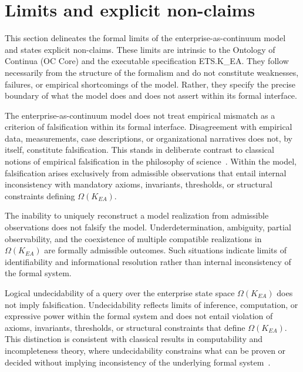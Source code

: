 ﻿\section{Limits and explicit non-claims}

This section delineates the formal limits of the
enterprise-as-continuum model and states explicit non-claims.
These limits are intrinsic to the Ontology of Continua (OC Core) and the
executable specification ETS.K\_EA.
They follow necessarily from the structure of the formalism and do not
constitute weaknesses, failures, or empirical shortcomings of the model.
Rather, they specify the precise boundary of what the model does and does
not assert within its formal interface.

\medskip

\begin{nonclaim}
The enterprise-as-continuum model does not treat empirical mismatch as a
criterion of falsification within its formal interface.
Disagreement with empirical data, measurements, case descriptions, or
organizational narratives does not, by itself, constitute falsification.
This stands in deliberate contrast to classical notions of empirical
falsification in the philosophy of science~\cite{popper1959logic}.
Within the model, falsification arises exclusively from admissible
observations that entail internal inconsistency with mandatory axioms,
invariants, thresholds, or structural constraints defining
\(\Omega(K_{EA})\).
\end{nonclaim}

\medskip

\begin{nonclaim}
The inability to uniquely reconstruct a model realization from admissible
observations does not falsify the model.
Underdetermination, ambiguity, partial observability, and the coexistence
of multiple compatible realizations in \(\Omega(K_{EA})\) are formally
admissible outcomes.
Such situations indicate limits of identifiability and informational
resolution rather than internal inconsistency of the formal system.
\end{nonclaim}

\medskip

\begin{nonclaim}
Logical undecidability of a query over the enterprise state space
\(\Omega(K_{EA})\) does not imply falsification.
Undecidability reflects limits of inference, computation, or expressive
power within the formal system and does not entail violation of axioms,
invariants, thresholds, or structural constraints that define
\(\Omega(K_{EA})\).
This distinction is consistent with classical results in computability and
incompleteness theory, where undecidability constrains what can be proven
or decided without implying inconsistency of the underlying formal
system~\cite{church1936unsolvable,turing1937computable,godel1931incompleteness}.
\end{nonclaim}

